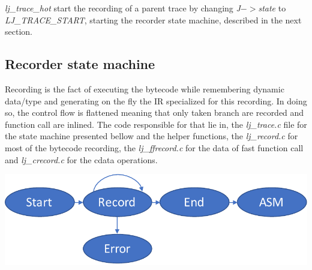 \emph{lj\_trace\_hot} start the recording of a parent trace by changing
\emph{J$->$state} to \emph{LJ\_TRACE\_START}, starting the recorder state
machine, described in the next section.



\subsection{Recorder state machine}
\label{Subsec:recorder-state-machine}

Recording is the fact of executing the bytecode while remembering dynamic
data/type and generating on the fly the IR specialized for this recording. In
doing so, the control flow is flattened meaning that only taken branch are
recorded and function call are inlined. The code responsible for that lie in, the
\emph{lj\_trace.c} file for the state machine presented bellow and the helper
functions, the \emph{lj\_record.c} for most of the bytecode recording,
the \emph{lj\_ffrecord.c} for the data of fast function call and
\emph{lj\_crecord.c} for the cdata operations.

\includegraphics[width=\textwidth]{./Images/FSM.pdf}


